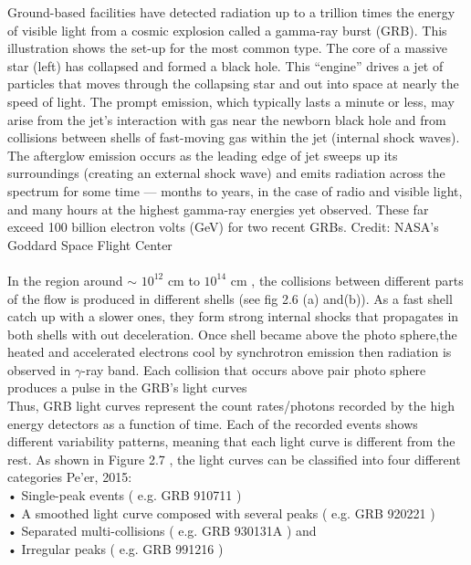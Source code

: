 Ground-based facilities have detected radiation up to a trillion times the energy of visible light from a cosmic explosion called a gamma-ray burst (GRB). This illustration shows the set-up for the most common type. The core of a massive star (left) has collapsed and formed a black hole. This “engine” drives a jet of particles that moves through the collapsing star and out into space at nearly the speed of light. The prompt emission, which typically lasts a minute or less, may arise from the jet’s interaction with gas near the newborn black hole and from collisions between shells of fast-moving gas within the jet (internal shock waves). The afterglow emission occurs as the leading edge of jet sweeps up its surroundings (creating an external shock wave) and emits radiation across the spectrum for some time — months to years, in the case of radio and visible light, and many hours at the highest gamma-ray energies yet observed. These far exceed 100 billion electron volts (GeV) for two recent GRBs. Credit: NASA’s Goddard Space Flight Center\\\\
In the region around $ \sim $ $ 10^{12} $ cm to  $ 10^{14} $ cm , the collisions between different parts of the flow is produced in different shells (see fig 2.6 (a) and(b)). As a fast shell catch up with a slower ones, they form strong internal shocks that propagates in both shells with out deceleration. Once shell became above the photo sphere,the heated and accelerated electrons cool by synchrotron emission then radiation is observed in $ \gamma $-ray band. Each collision that occurs above pair photo sphere produces a pulse in the GRB’s light curves \citep {22}\\
Thus, GRB light curves represent the count rates/photons recorded by the high energy detectors as a function of time. Each of the recorded events shows different variability patterns, meaning that each light curve is different from the rest. As  shown in Figure 2.7 , the light curves can be classified into four  different categories Pe’er, 2015:\\
• Single-peak events ( e.g. GRB 910711 ) \\
• A smoothed light curve composed with several peaks ( e.g. GRB 920221 )\\
• Separated multi-collisions (  e.g. GRB 930131A  ) and \\
• Irregular peaks (  e.g. GRB 991216  ) \\

